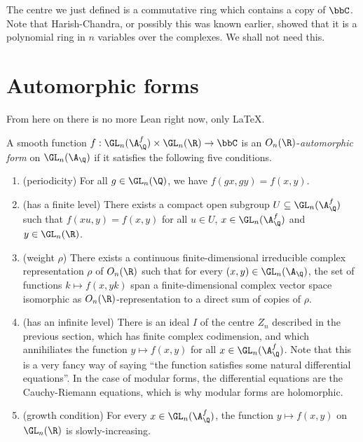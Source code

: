 \begin{remark} The centre we just defined is a commutative ring which contains a copy of $\bbC$.
  Note that Harish-Chandra, or possibly this was known earlier, showed that it is a polynomial
  ring in $n$ variables over the complexes. We shall not need this.
\end{remark}

\section{Automorphic forms}

From here on there is no more Lean right now, only LaTeX.

\begin{definition}
  \label{AutomorphicForm.GLn.AutomorphicFormForGLnOverQ}
  A smooth function $f:\GL_n(\A_{\Q}^f)\times\GL_n(\R)\to\bbC$ is
  an $O_n(\R)$-\emph{automorphic form} on $\GL_n(\A_{\Q})$ if it satisfies the following
  five conditions.
  \begin{enumerate}
    \item (periodicity) For all $g\in\GL_n(\Q)$, we have $f(gx,gy)=f(x,y)$.
    \item (has a finite level) There exists a compact open subgroup $U\subseteq\GL_n(\A_{\Q}^f)$
      such that $f(xu,y)=f(x,y)$ for all $u\in U$, $x\in \GL_n(\A_{\Q}^f)$ and $y\in\GL_n(\R)$.
    \item (weight $\rho$) There exists a continuous finite-dimensional irreducible complex
    representation $\rho$ of $O_n(\R)$ such that for every $(x,y)\in\GL_n(\A_{\Q})$, the
    set of functions $k\mapsto f(x,yk)$ span a finite-dimensional complex vector space isomorphic
    as $O_n(\R)$-representation to a direct sum of copies of $\rho$.
    \item (has an infinite level) There is an ideal $I$ of the centre $Z_n$ described in the
    previous section, which has finite complex codimension, and which annihiliates the
    function $y \mapsto f(x,y)$ for all $x\in \GL_n(\A_{\Q}^f)$. Note that this is a very fancy
    way of saying ``the function satisfies some natural differential equations''. In the
    case of modular forms, the differential equations are the Cauchy-Riemann equations, which
    is why modular forms are holomorphic.
    \item (growth condition) For every $x\in\GL_n(\A_{\Q}^f)$, the function $y\mapsto f(x,y)$
  on $\GL_n(\R)$ is slowly-increasing.
  \end{enumerate}

\end{definition}

